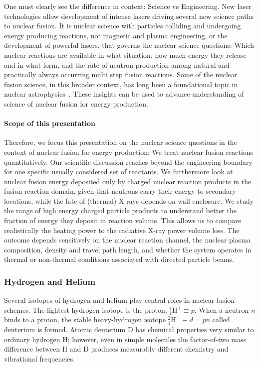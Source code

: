 \documentclass[particles,article,accept,pdftex,moreauthors]{Definitions/mdpi}
\begin{document}
One must clearly see the difference in context: Science vs Engineering. New laser technologies allow development of intense lasers driving several new science paths to nuclear fusion. It is nuclear science with particles colliding and undergoing energy producing reactions, not magnetic and plasma engineering, or the development of powerful lasers, that governs the nuclear science questions: Which nuclear reactions are available in what situation, how much energy they release and in what form, and the rate of neutron production among natural and practically always occurring multi step fusion reactions. Some of the nuclear fusion science, in this broader context, has long been a foundational topic in nuclear astrophysics~\cite{Salas2026Neelima,Nunes:2009,Iliadis:2007,Arnett:1996ev,Rolfs:1988,Clayton:1984}. These insights can be used to advance understanding of science of nuclear fusion for energy production.

\paragraph*{\bf Scope of this presentation}
Therefore, we focus this presentation on the nuclear science questions in the context of nuclear fusion for energy production: We treat nuclear fusion reactions quantitatively. Our scientific discussion reaches beyond the engineering boundary for one specific usually considered set of reactants. We furthermore look at nuclear fusion energy deposited only by charged nuclear reaction products in the fusion reaction domain, given that neutrons carry their energy to secondary locations, while the fate of (thermal) X-rays depends on wall enclosure. We study the range of high energy charged particle products to understand better the fraction of energy they deposit in reaction volume. This allows us to compare realistically the heating power to the radiative X-ray power volume loss. The outcome depends sensitively on the nuclear reaction channel, the nuclear plasma composition, density and travel path length, and whether the system operates in thermal or non-thermal conditions associated with directed particle beams.

 \subsubsection{Hydrogen and Helium}\label{sssec:HHe}
Several isotopes of hydrogen and helium play central roles in nuclear fusion schemes. The lightest hydrogen isotope is the proton, ${}^{1\!}_{1\!}\mathrm{H}^+\equiv p$. When a neutron $n$ binds to a proton, the stable heavy-hydrogen isotope ${}^{2\!}_{1\!}\mathrm{H}^+\equiv d=pn$ called deuterium is formed. Atomic deuterium D has chemical properties very similar to ordinary hydrogen H; however, even in simple molecules the factor-of-two mass difference between H and D produces measurably different chemistry and vibrational frequencies.
\end{document}
